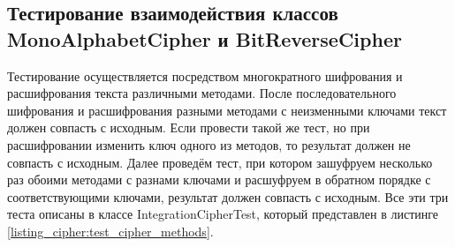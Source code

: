 \documentclass[a4paper,12pt]{article}
\begin{document}
\newpage\subsection{Тестирование взаимодействия классов \\MonoAlphabetCipher и BitReverseCipher}
Тестирование осуществляется посредством многократного шифрования и расшифрования текста различными методами. После последовательного шифрования и расшифрования разными методами с неизменными ключами текст должен совпасть с исходным. Если провести такой же тест, но при расшифровании изменить ключ одного из методов, то результат должен не совпасть с исходным. Далее проведём тест, при котором зашуфруем несколько раз обоими методами с разнами ключами и расшуфруем в обратном порядке с соответствующими ключами, результат должен совпасть с исходным. Все эти три теста описаны в классе IntegrationCipherTest, который представлен в листинге \ref{listing_cipher:test_cipher_methods}.
\end{document}
